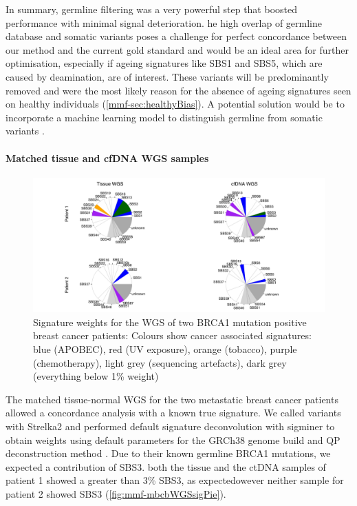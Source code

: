In summary, germline filtering was a very powerful step that  boosted  performance with minimal signal deterioration. he high overlap of germline database and somatic variants poses a challenge for perfect concordance between our method and the current gold standard and would be an ideal area for further optimisation, especially if ageing signatures like SBS1 and SBS5, which are caused by deamination, are of interest. These variants will be predominantly removed and were the most likely reason for the absence of ageing signatures seen on healthy individuals (\autoref{mmf-sec:healthyBias}). A potential solution would be to incorporate a machine learning model to distinguish germline from somatic variants \cite{Spinella2016,Sahraeian2022}.

\paragraph{Matched tissue and cfDNA WGS samples}
\label{mmf-sec:matchedMBCB}

\begin{figure}[ht]
\centering
\includegraphics[width=.99\linewidth]{Figures/MisMatchFinder/mbcbWGSsignatures.pdf}
\caption[Signature weights for the WGS of two BRCA1 mutation positive breast cancer patients]{Signature weights for the WGS of two BRCA1 mutation positive breast cancer patients: Colours show cancer associated signatures: blue (APOBEC), red (UV exposure), orange (tobacco), purple (chemotherapy), light grey (sequencing artefacts), dark grey (everything below 1\% weight)}\label{fig:mmf-mbcbWGSsigPie}
\end{figure}
 
The matched tissue-normal WGS for the two metastatic breast cancer patients allowed a concordance analysis with a known true signature. We called variants with Strelka2 and performed default signature deconvolution with sigminer to obtain weights using default parameters for the GRCh38 genome build and QP deconstruction method  \cite{Wang2021}. Due to their known germline BRCA1 mutations, we expected a contribution of SBS3.  both the tissue and the ctDNA samples of patient 1 showed a greater than 3\% SBS3, as expectedowever neither sample for patient 2 showed SBS3 (\autoref{fig:mmf-mbcbWGSsigPie}).
 
